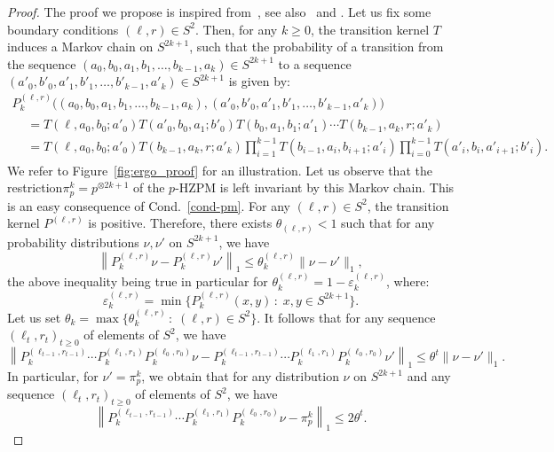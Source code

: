\documentclass[AHL,Unicode,longabstracts]{cedram}
\newcounter{a}
\newcommand{\Cond}{Cond.}
\begin{document}
\begin{proof}
The proof we propose is inspired from~\cite{vasilyev}, see also~\cite{dobrushin} and \cite{marco_cie}. Let us fix some boundary conditions $(\ell, r)\in S^2$. Then, for any $k\geq 0$, the transition kernel $T$ induces a Markov chain on $S^{2k+1}$, such that the probability of a transition from the sequence $(a_0,b_0,a_1,b_1,\ldots, b_{k-1},a_{k})\in S^{2k+1}$ to a sequence $(a'_0,b'_0,a'_1,b'_1,\ldots, b'_{k-1},a'_{k})\in S^{2k+1}$ is given by:
\begin{multline*}
P_k^{(\ell,r)}\big((a_0,b_0,a_1,b_1,\ldots, b_{k-1},a_{k}), (a'_0,b'_0,a'_1,b'_1,\ldots, b'_{k-1},a'_{k})\big)\\
\begin{aligned}
& =T(\ell, a_0, b_0;a'_0)T(a'_0,b_0,a_1;b'_0)T(b_0, a_1, b_1;a'_1)\cdots T(b_{k-1},a_{k},r;a'_k)\\
& = T(\ell, a_0, b_0;a'_0)T(b_{k-1},a_{k},r;a'_k)\prod_{i=1}^{k-1}T(b_{i-1}, a_i, b_{i+1};a'_i)\prod_{i=0}^{k-1}T(a'_{i}, b_i, a'_{i+1};b'_i).
\end{aligned}
\end{multline*}
We refer to Figure~\ref{fig:ergo_proof} for an illustration. Let us observe that the restriction\linebreak $\pi^k_p=p^{\otimes 2k+1}$ of the $p$-HZPM is left invariant by this Markov chain. This is an easy consequence of \Cond~\ref{cond-pm}. For any $(\ell,r)\in S^2$, the transition kernel $P^{(\ell,r)}$ is positive. Therefore, there exists $\theta_{(\ell,r)}<1$ such that for any probability distributions $\nu, \nu'$ on $S^{2k+1}$, we have
\[
\left\|P_k^{(\ell,r)}\nu-P_k^{(\ell,r)}\nu'\right\|_1\leq \theta_k^{(\ell,r)} \|\nu-\nu'\|_1,
\]
the above inequality being true in particular for $\theta_k^{(\ell,r)}=1-\varepsilon_k^{(\ell,r)}$, where:
\[
\varepsilon_k^{(\ell,r)}=\min\{P_k^{(\ell,r)}(x,y) \, : \; x,y\in S^{2k+1}\}.
\]
Let us set $\theta_k=\max\{\theta_k^{(\ell,r)} \, : \; (\ell,r)\in S^2\}$. It follows that for any sequence $(\ell_t,r_t)_{t\geq 0}$ of elements of $S^2$, we have
\[
\left\|P_k^{(\ell_{t-1},r_{t-1})}\cdots P_k^{(\ell_{1},r_{1})}P_k^{(\ell_{0},r_{0})}\nu-P_k^{(\ell_{t-1},r_{t-1})}\cdots P_k^{(\ell_{1},r_{1})}P_k^{(\ell_{0},r_{0})}\nu'\right\|_1\leq \theta^t \|\nu-\nu'\|_1.
\]
In particular, for $\nu'=\pi^k_p$, we obtain that for any distribution $\nu$ on $S^{2k+1}$ and any sequence $(\ell_t,r_t)_{t\geq 0}$ of elements of $S^2$, we have
\[
\left\|P_k^{(\ell_{t-1},r_{t-1})}\cdots P_k^{(\ell_{1},r_{1})}P_k^{(\ell_{0},r_{0})}\nu-\pi^k_p\right\|_1\leq 2\theta^t.
\]
\end{proof}
\end{document}
